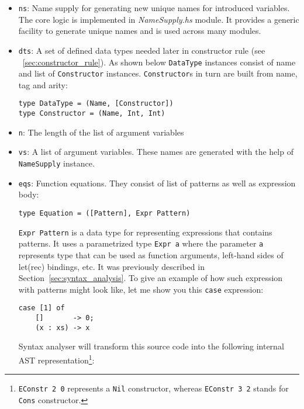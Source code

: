 \documentclass[12pt,a4paper]{report}
\begin{document}
\begin{itemize}
  \item \texttt{ns}: Name supply for generating new unique names for
    introduced variables. The core logic is implemented in
    \textit{NameSupply.hs} module. It provides a generic facility to generate
    unique names and is used across many modules.
  \item \texttt{dts}: A set of defined data types needed later in constructor
    rule (see ~\ref{sec:constructor_rule}). As shown below \texttt{DataType}
    instances consist of name and list of \texttt{Constructor} instances.
    \texttt{Constructor}s in turn are built from name, tag and arity:

\hspace*{-1.5in}
\begin{lstlisting}[style=haskell]
type DataType = (Name, [Constructor])
type Constructor = (Name, Int, Int)
\end{lstlisting}

  \item \texttt{n}: The length of the list of argument variables
  \item \texttt{vs}: A list of argument variables. These names are generated
    with the help of \texttt{NameSupply} instance.
  \item \texttt{eqs}: Function equations. They consist of list of patterns as
    well as expression body:

\hspace*{-1.5in}
\begin{lstlisting}[style=haskell]
type Equation = ([Pattern], Expr Pattern)
\end{lstlisting}
\texttt{Expr Pattern} is a data type for representing expressions that contains
patterns. It uses a parametrized type \texttt{Expr a} where the parameter
\texttt{a} represents type that can be used as function arguments, left-hand
sides of let(rec) bindings, etc. It was previously described in
Section~\ref{sec:syntax_analysis}.
To give an example of how such expression with patterns might look like, let me
show you this \texttt{case} expression:

\hspace*{-1.5in}
\begin{lstlisting}[style=haskell]
case [1] of
    []       -> 0;
    (x : xs) -> x
\end{lstlisting}
Syntax analyser will transform this source code into the following internal AST
representation\footnote{\texttt{EConstr 2 0} represents a \texttt{Nil}
constructor, whereas \texttt{EConstr 3 2} stands for \texttt{Cons} constructor.}:


\end{itemize}
\end{document}
